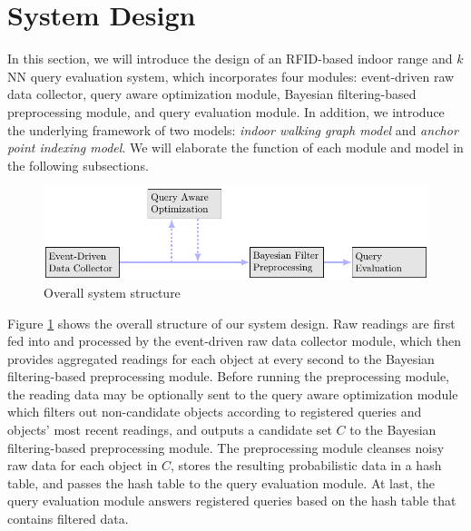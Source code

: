 \documentclass[12pt]{report}
\begin{document}
\part{System Design}
\label{sec:system-design}
In this section, we will introduce the design of an RFID-based
indoor range and \(k\)NN query evaluation system, which incorporates
four modules: event-driven raw data collector, query aware
optimization module, Bayesian filtering-based preprocessing module,
and query evaluation module.  In addition, we introduce the
underlying framework of two models: \emph{indoor walking graph model} and
\emph{anchor point indexing model}.  We will elaborate the function of
each module and model in the following subsections.

\begin{figure}[htbp]
\centering
\includegraphics[width=.8\textwidth]{img/system-design.pdf}
\caption{\label{fig:overall}
Overall system structure}
\end{figure}

Figure \ref{fig:overall} shows the overall structure of our system design.
Raw readings are first fed into and processed by the event-driven
raw data collector module, which then provides aggregated readings
for each object at every second to the Bayesian filtering-based
preprocessing module.  Before running the preprocessing module, the
reading data may be optionally sent to the query aware optimization
module which filters out non-candidate objects according to
registered queries and objects' most recent readings, and outputs a
candidate set \(C\) to the Bayesian filtering-based preprocessing
module.  The preprocessing module cleanses noisy raw data for each
object in \(C\), stores the resulting probabilistic data in a hash
table, and passes the hash table to the query evaluation module.  At
last, the query evaluation module answers registered queries based
on the hash table that contains filtered data.
\end{document}
